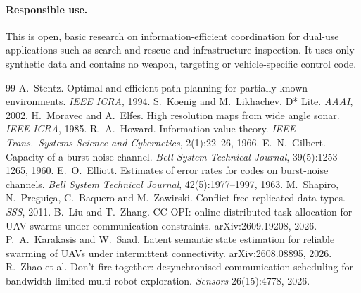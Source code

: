 \documentclass[11pt,a4paper]{article}
\theoremstyle{definition}
\begin{document}
\paragraph{Responsible use.} This is open, basic research on information-efficient coordination for dual-use applications such as search and rescue and infrastructure inspection. It uses only synthetic data and contains no weapon, targeting or vehicle-specific control code.

\begin{thebibliography}{99}\small
{} A.~Stentz. Optimal and efficient path planning for partially-known environments. \emph{IEEE ICRA}, 1994.
 S.~Koenig and M.~Likhachev. D* Lite. \emph{AAAI}, 2002.
 H.~Moravec and A.~Elfes. High resolution maps from wide angle sonar. \emph{IEEE ICRA}, 1985.
 R.~A.~Howard. Information value theory. \emph{IEEE Trans.\ Systems Science and Cybernetics}, 2(1):22--26, 1966.
 E.~N.~Gilbert. Capacity of a burst-noise channel. \emph{Bell System Technical Journal}, 39(5):1253--1265, 1960.
 E.~O.~Elliott. Estimates of error rates for codes on burst-noise channels. \emph{Bell System Technical Journal}, 42(5):1977--1997, 1963.
 M.~Shapiro, N.~Pregui\c{c}a, C.~Baquero and M.~Zawirski. Conflict-free replicated data types. \emph{SSS}, 2011.
 B.~Liu and T.~Zhang. CC-OPI: online distributed task allocation for UAV swarms under communication constraints. arXiv:2609.19208, 2026.
 P.~A.~Karakasis and W.~Saad. Latent semantic state estimation for reliable swarming of UAVs under intermittent connectivity. arXiv:2608.08895, 2026.
 R.~Zhao et al. Don't fire together: desynchronised communication scheduling for bandwidth-limited multi-robot exploration. \emph{Sensors} 26(15):4778, 2026.
\end{thebibliography}
\end{document}
